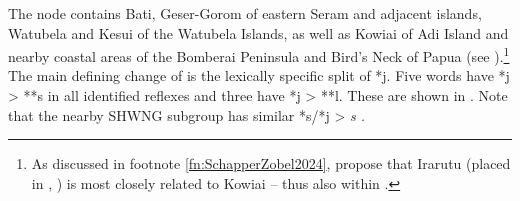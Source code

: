 \largerpage
{}
The  node contains Bati,
Geser-Gorom of eastern Seram
and adjacent islands, Watubela
and Kesui of the Watubela Islands,
as well as Kowiai of Adi Island
and nearby coastal areas of the Bomberai Peninsula
and Bird’s Neck of Papua (see ).\footnote{
		As discussed
		in footnote \ref{fn:SchapperZobel2024}, \citet{SchapperZobel2024b} propose that Irarutu (placed
		in , ) is most closely related to Kowiai -- thus also
		within .}
The main defining change of  is the lexically
specific split of *j.
Five words have *j > **s in all identified reflexes
and three have *j > **l.
These are shown in .
Note that the nearby SHWNG subgroup has similar *s/*j > \it{s} \citep[52f]{Kamholz2014}.

